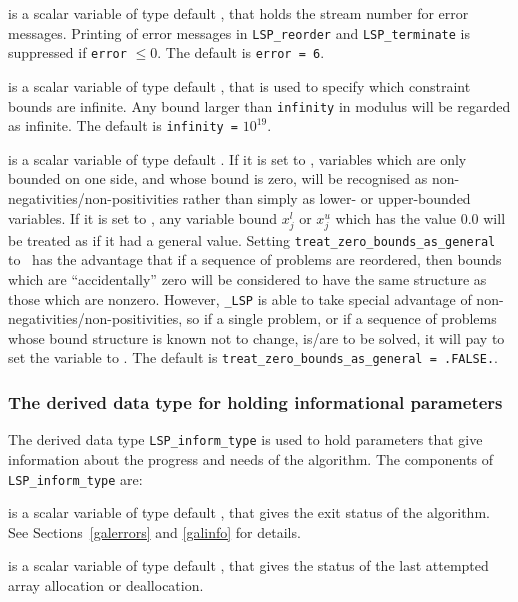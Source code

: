 \documentclass{galahad}
\newcommand{\packagename}{LSP}
\newcommand{\fullpackagename}{\libraryname\_\packagename}
\begin{document}
\begin{description}

 is a scalar variable of type default \integer, that holds the
stream number for error messages. Printing of error messages in
{\tt \packagename\_reorder} and {\tt \packagename\_terminate}
is suppressed if {\tt error} $\leq 0$.
The default is {\tt error = 6}.

 is a scalar variable of type default \realdp, that is used to
specify which constraint bounds are infinite.
Any bound larger than {\tt infinity} in modulus will be regarded as infinite.
The default is {\tt infinity =} $10^{19}$.

 is a scalar variable of type
default \logical.
If it is set to \false, variables which
are only bounded on one side, and whose bound is zero,
will be recognised as non-negativities/non-positivities rather than simply as
lower- or upper-bounded variables.
If it is set to \true, any variable bound
$x_{j}^{l}$ or $x_{j}^{u}$ which has the value 0.0 will be
treated as if it had a general value.
Setting {\tt treat\_zero\_bounds\_as\_general} to \true\ has the advantage
that if a sequence of problems are reordered, then bounds which are
``accidentally'' zero will be considered to have the same structure as
those which are nonzero. However, {\tt \fullpackagename} is
able to take special advantage of non-negativities/non-positivities, so
if a single problem, or if a sequence of problems whose
bound structure is known not to change, is/are to be solved,
it will pay to set the variable to \false.
The default is {\tt treat\_zero\_bounds\_as\_general = .FALSE.}.

\end{description}


\subsubsection{The derived data type for holding informational
 parameters}\label{typeinform}
The derived data type
{\tt \packagename\_inform\_type}
is used to hold parameters that give information about the progress and needs
of the algorithm. The components of
{\tt \packagename\_inform\_type}
are:

\begin{description}

 is a scalar variable of type default \integer, that gives the
exit status of the algorithm. See Sections~\ref{galerrors} and \ref{galinfo}
for details.

 is a scalar variable of type default \integer, that gives
the status of the last attempted array allocation or deallocation.

\end{description}
\end{document}
